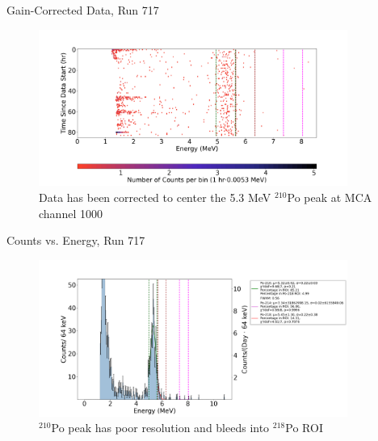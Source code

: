 \documentclass[aspectratio=169]{beamer}
\begin{document}
\begin{frame}{Gain-Corrected Data, Run 717}
    \begin{figure}
        \begin{center}
            \includegraphics[width=0.9\textwidth]
            {assets/717/CD.png}
            \caption{Data has been corrected to center the 5.3 MeV $^{210}$Po peak at MCA channel 1000}
        \end{center}
    \end{figure}
\end{frame}

\begin{frame}{Counts vs. Energy, Run 717}
    \begin{figure}
        \begin{center}
            \includegraphics[width=0.9\textwidth]
            {assets/717/CvE.png}
            \caption{$^{210}$Po peak has poor resolution and bleeds into $^{218}$Po ROI}
        \end{center}
    \end{figure}
\end{frame}
\end{document}
